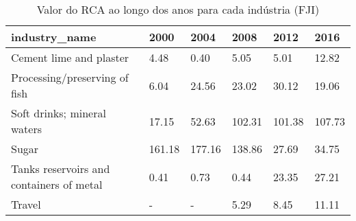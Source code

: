 \begin{table}
\centering
\caption{Valor do RCA ao longo dos anos para cada indústria (FJI)}
\begin{tabular}{p{6cm}p{1.5cm}p{1.5cm}p{1.5cm}p{1.5cm}p{1.5cm}}
\toprule
                           industry\_name &   2000 &   2004 &   2008 &   2012 &   2016 \\
\midrule
                 Cement lime and plaster &   4.48 &   0.40 &   5.05 &   5.01 &  12.82 \\
           Processing/preserving of fish &   6.04 &  24.56 &  23.02 &  30.12 &  19.06 \\
             Soft drinks; mineral waters &  17.15 &  52.63 & 102.31 & 101.38 & 107.73 \\
                                   Sugar & 161.18 & 177.16 & 138.86 &  27.69 &  34.75 \\
Tanks reservoirs and containers of metal &   0.41 &   0.73 &   0.44 &  23.35 &  27.21 \\
                                  Travel &      - &      - &   5.29 &   8.45 &  11.11 \\
\bottomrule
\end{tabular}
\end{table}
